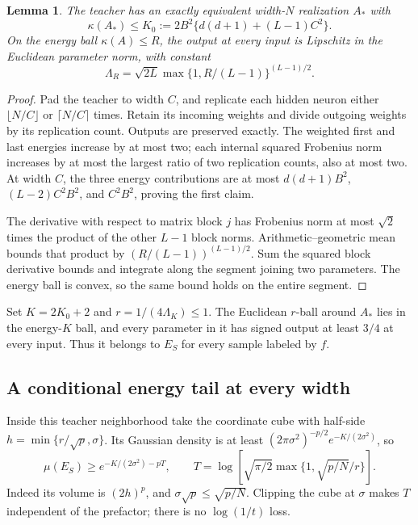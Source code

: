 \documentclass[11pt]{article}
\newtheorem{lemma}[theorem]{Lemma}
\theoremstyle{remark}\newtheorem{remark}[theorem]{Remark}
\begin{document}
\begin{lemma}\label{lem:teacher}
The teacher has an exactly equivalent width-$N$ realization $A_*$ with
\[
 \kappa(A_*)\le K_0:=2B^2\{d(d+1)+(L-1)C^2\}.
\]
On the energy ball $\kappa(A)\le R$, the output at every input is
Lipschitz in the Euclidean parameter norm, with constant
\[
 \Lambda_R=\sqrt{2L}\max\{1,R/(L-1)\}^{(L-1)/2}.
\]
\end{lemma}
\begin{proof}
Pad the teacher to width $C$, and replicate each hidden neuron either
$\lfloor N/C\rfloor$ or $\lceil N/C\rceil$ times. Retain its incoming
weights and divide outgoing weights by its replication count. Outputs
are preserved exactly. The weighted first and last energies increase
by at most two; each internal squared Frobenius norm increases by at
most the largest ratio of two replication counts, also at most two.
At width $C$, the three energy contributions are at most
$d(d+1)B^2$, $(L-2)C^2B^2$, and $C^2B^2$, proving the first claim.

The derivative with respect to matrix block $j$ has Frobenius norm at
most $\sqrt2$ times the product of the other $L-1$ block norms.
Arithmetic--geometric mean bounds that product by
$(R/(L-1))^{(L-1)/2}$. Sum the squared block derivative bounds and
integrate along the segment joining two parameters. The energy ball
is convex, so the same bound holds on the entire segment.
\end{proof}

Set $K=2K_0+2$ and $r=1/(4\Lambda_K)\le1$. The Euclidean $r$-ball
around $A_*$ lies in the energy-$K$ ball, and every parameter in it
has signed output at least $3/4$ at every input. Thus it belongs to
$E_S$ for every sample labeled by $f$.

\subsection{A conditional energy tail at every width}

Inside this teacher neighborhood take the coordinate cube with half-side
$h=\min\{r/\sqrt p,\sigma\}$. Its Gaussian density is at least
$(2\pi\sigma^2)^{-p/2}e^{-K/(2\sigma^2)}$, so
\begin{equation}\label{eq:denominator}
 \mu(E_S)\ge e^{-K/(2\sigma^2)-pT},\qquad
 T=\log\!\left[\sqrt{\pi/2}
                   \max\{1,\sqrt{p/N}/r\}\right].
\end{equation}
Indeed its volume is $(2h)^p$, and $\sigma\sqrt p\le\sqrt{p/N}$.
Clipping the cube at $\sigma$ makes $T$ independent of the prefactor;
there is no $\log(1/t)$ loss.
\end{document}
